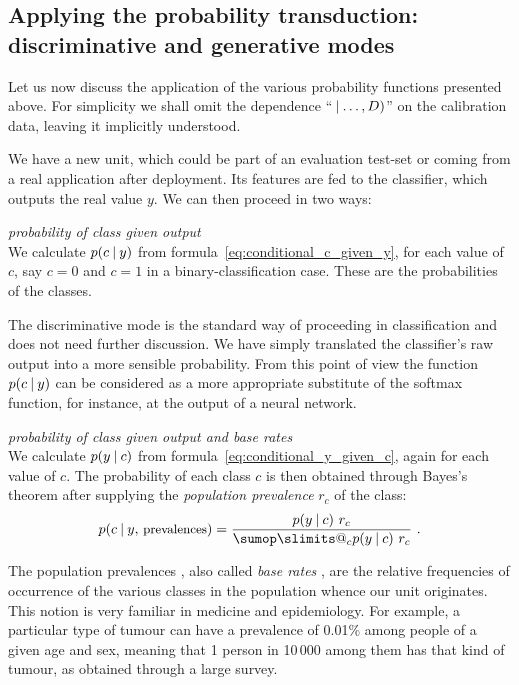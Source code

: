 \documentclass[\ifafour a4paper,12pt,\else a5paper,10pt,\fi%
onecolumn,oneside,article,%
british%
]{memoir}
\makeatletter
\theoremstyle{remark}
\theoremstyle{innote}
\def\sum{\DOTSI\sumop\slimits@}
\renewcommand*{\|}[1][]{\nonscript\:#1\vert\nonscript\:\mathopen{}}
\newcommand*{\sect}{\S}%
\newcommand*{\chap}{ch.}%
\newcommand*{\texts}[1]{\text{\small #1}}
\newcommand*{\br}{r}
\makeatother
\begin{document}
\subsection{Applying the probability transduction: discriminative and generative modes}
\label{sec:effect_transd}

Let us now discuss the application of the various probability functions presented above. For simplicity we shall omit the dependence \enquote{$\|\dotsc, D)$} on the calibration data, leaving it implicitly understood.

We have a new unit, which could be part of an evaluation test-set or coming from a real application after deployment. Its features are fed to the classifier, which outputs the real value $y$. We can then proceed in two ways:
\begin{description}[font=\textit]
\item[Discriminative mode:] \textit{probability of class given output}\\
 We calculate $p(c \| y)$ from formula~\eqref{eq:conditional_c_given_y}, for each value of $c$, say $c=0$ and $c=1$ in a binary-classification case. These are the probabilities of the classes.
\end{description}
The discriminative mode is the standard way of proceeding in classification and does not need further discussion. We have simply translated the classifier's raw output into a more sensible probability. From this point of view the function $p(c \| y)$ can be considered as a more appropriate substitute of the softmax function, for instance, at the output of a neural network.


\begin{description}[resume, font=\textit]
\item[Generative mode:] \textit{probability of class given output and base rates}\\
  We calculate $p(y \| c)$ from formula~\eqref{eq:conditional_y_given_c}, again for each value of $c$. The probability of each class $c$ is then obtained through Bayes's theorem after supplying the \emph{population prevalence} $\br_{c}$ of the class:
  \begin{equation}
    \label{eq:bayes_baserate}
    p(c \| y,\, \texts{prevalences}) = \frac{p(y \| c)\ \br_{c}}{ \sum_{c} p(y \| c)\ \br_{c} } \ .
  \end{equation}
\end{description}
The population prevalences \autocites[\chap~3]{soxetal1988_r2013}[\sect~5.1]{huninketal2001_r2014}, also called \emph{base rates} \autocites{barhillel1980,axelsson2000}, are the relative frequencies of occurrence of the various classes in the population whence our unit originates. This notion is very familiar in medicine and epidemiology. For example, a particular type of tumour can have a prevalence of 0.01\% among people of a given age and sex, meaning that 1 person in 10\,000 among them has that kind of tumour, as obtained through a large survey.
\end{document}
